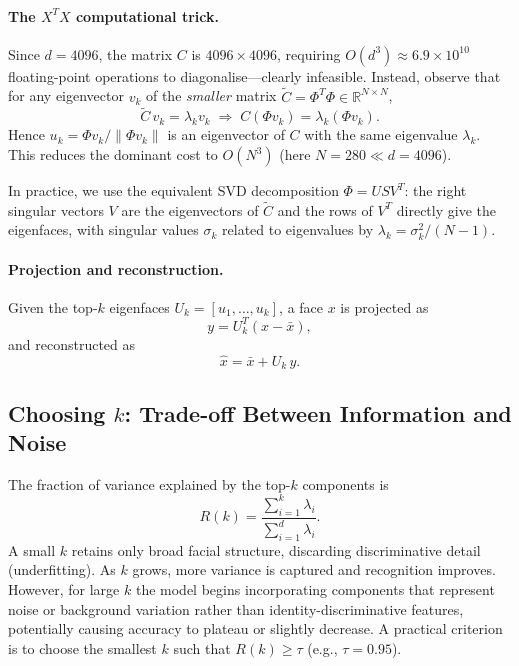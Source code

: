 \documentclass[a4paper,fleqn]{cas-sc}
\begin{document}
\paragraph{The $X^T X$ computational trick.}
Since $d = 4096$, the matrix $C$ is $4096\times4096$, requiring $O(d^3) \approx 6.9\times10^{10}$ floating-point operations to diagonalise---clearly infeasible. Instead, observe that for any eigenvector $v_k$ of the \emph{smaller} matrix $\tilde{C} = \Phi^T\Phi \in \mathbb{R}^{N \times N}$,
\begin{equation}
    \tilde{C}\,v_k = \lambda_k v_k \;\Longrightarrow\; C(\Phi v_k) = \lambda_k (\Phi v_k).
\end{equation}
Hence $u_k = \Phi v_k / \|\Phi v_k\|$ is an eigenvector of $C$ with the same eigenvalue $\lambda_k$. This reduces the dominant cost to $O(N^3)$ (here $N = 280 \ll d = 4096$).

In practice, we use the equivalent SVD decomposition $\Phi = U S V^T$: the right singular vectors $V$ are the eigenvectors of $\tilde{C}$ and the rows of $V^T$ directly give the eigenfaces, with singular values $\sigma_k$ related to eigenvalues by $\lambda_k = \sigma_k^2 / (N-1)$.

\paragraph{Projection and reconstruction.}
Given the top-$k$ eigenfaces $U_k = [u_1, \ldots, u_k]$, a face $x$ is projected as
\begin{equation}
    y = U_k^T (x - \bar{x}),
\end{equation}
and reconstructed as
\begin{equation}
    \hat{x} = \bar{x} + U_k\, y.
\end{equation}

\subsection{Choosing $k$: Trade-off Between Information and Noise}

The fraction of variance explained by the top-$k$ components is
\begin{equation}
    R(k) = \frac{\sum_{i=1}^{k}\lambda_i}{\sum_{i=1}^{d}\lambda_i}.
\end{equation}
A small $k$ retains only broad facial structure, discarding discriminative detail (underfitting). As $k$ grows, more variance is captured and recognition improves. However, for large $k$ the model begins incorporating components that represent noise or background variation rather than identity-discriminative features, potentially causing accuracy to plateau or slightly decrease. A practical criterion is to choose the smallest $k$ such that $R(k) \geq \tau$ (e.g., $\tau = 0.95$).
\end{document}
